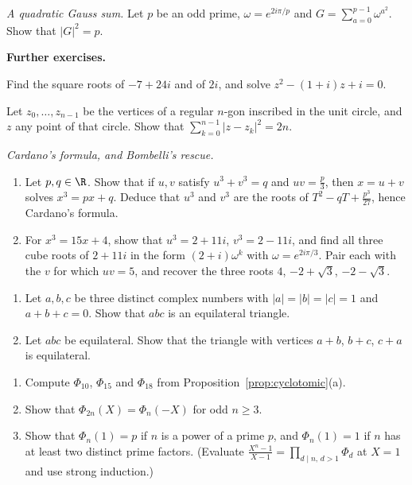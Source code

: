 \begin{exercise}[$\star\star\star$]\label{ex:gauss}
\emph{A quadratic Gauss sum.} Let $p$ be an odd prime, $\omega=e^{2i\pi/p}$ and $G=\sum_{a=0}^{p-1}\omega^{a^2}$. Show that $|G|^2=p$.
\end{exercise}

\medskip\noindent\textbf{Further exercises.}

\begin{exercise}[$\star$]\label{ex:sqrtz}
Find the square roots of $-7+24i$ and of $2i$, and solve $z^2-(1+i)z+i=0$.
\end{exercise}

\begin{exercise}[$\star$]\label{ex:sumdist}
Let $z_0,\dots,z_{n-1}$ be the vertices of a regular $n$-gon inscribed in the unit circle, and $z$ any point of that circle. Show that
$\sum_{k=0}^{n-1}|z-z_k|^2=2n$.
\end{exercise}

\begin{exercise}[$\star\star$]\label{ex:cardano}
\emph{Cardano's formula, and Bombelli's rescue.}
\begin{enumerate}[label=(\alph*)]
\item Let $p,q\in\R$. Show that if $u,v$ satisfy $u^3+v^3=q$ and $uv=\frac p3$, then $x=u+v$ solves $x^3=px+q$. Deduce that $u^3$ and $v^3$ are the roots of $T^2-qT+\frac{p^3}{27}$, hence Cardano's formula.
\item For $x^3=15x+4$, show that $u^3=2+11i$, $v^3=2-11i$, and find all three cube roots of $2+11i$ in the form $(2+i)\omega^k$ with $\omega=e^{2i\pi/3}$. Pair each with the $v$ for which $uv=5$, and recover the three roots $4$, $-2+\sqrt3$, $-2-\sqrt3$.
\end{enumerate}
\end{exercise}

\begin{exercise}[$\star\star$]\label{ex:equi}
\begin{enumerate}[label=(\alph*)]
\item Let $a,b,c$ be three distinct complex numbers with $|a|=|b|=|c|=1$ and $a+b+c=0$. Show that $abc$ is an equilateral triangle.
\item Let $abc$ be equilateral. Show that the triangle with vertices $a+b$, $b+c$, $c+a$ is equilateral.
\end{enumerate}
\end{exercise}

\begin{exercise}[$\star\star$]\label{ex:cyclo}
\begin{enumerate}[label=(\alph*)]
\item Compute $\Phi_{10}$, $\Phi_{15}$ and $\Phi_{18}$ from Proposition~\ref{prop:cyclotomic}(a).
\item Show that $\Phi_{2n}(X)=\Phi_n(-X)$ for odd $n\ge3$.
\item Show that $\Phi_n(1)=p$ if $n$ is a power of a prime $p$, and $\Phi_n(1)=1$ if $n$ has at least two distinct prime factors. (Evaluate $\frac{X^n-1}{X-1}=\prod_{d\mid n,\,d>1}\Phi_d$ at $X=1$ and use strong induction.)
\end{enumerate}
\end{exercise}


